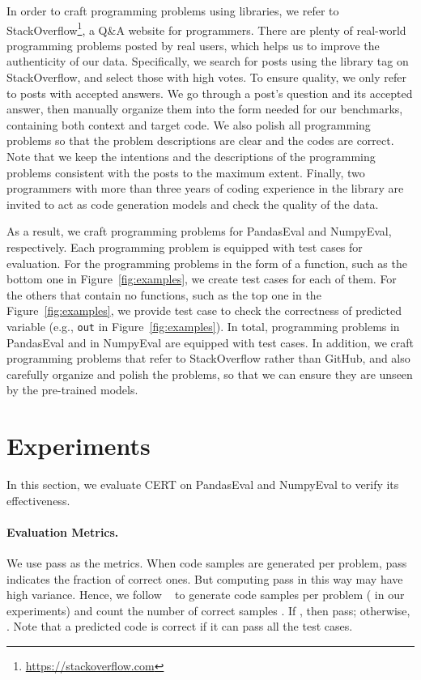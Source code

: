 \documentclass{article}
\newcommand{\cert}{\textsc{CERT}\xspace}
\newcommand{\peval}{PandasEval\xspace}
\newcommand{\neval}{NumpyEval\xspace}
\newcommand{\citet}[1] {\citeauthor{#1}~\shortcite{#1}}
\begin{document}
In order to craft programming problems using libraries, we refer to StackOverflow\footnote{\url{https://stackoverflow.com}}, a Q\&A website for programmers.
There are plenty of real-world programming problems posted by real users, which helps us to improve the authenticity of our data. 
Specifically, we search for posts using the library tag on StackOverflow, and select those with high votes. To ensure quality, we only refer to posts with accepted answers. We go through a post's question and its accepted answer, then manually organize them into the form needed for our benchmarks, containing both context and target code. We also polish all programming problems so that the problem descriptions are clear and the codes are correct. Note that we keep the intentions and the descriptions of the programming problems consistent with the posts to the maximum extent.
Finally, two programmers with more than three years of coding experience in the library are invited to act as code generation models and check the quality of the data.

As a result, we craft  programming problems for \peval and \neval, respectively. 
Each programming problem is equipped with test cases for evaluation. 
For the programming problems in the form of a function, such as the bottom one in Figure~\ref{fig:examples}, we create  test cases for each of them. For the others that contain no functions, such as the top one in the Figure~\ref{fig:examples}, we provide  test case to check the correctness of predicted variable (e.g., \texttt{out} in Figure~\ref{fig:examples}). 
In total,  programming problems in \peval and  in \neval are equipped with  test cases.
In addition, we craft programming problems that refer to StackOverflow rather than GitHub, and also carefully organize and polish the problems, so that we can ensure they are unseen by the pre-trained models.

\section{Experiments} \label{experiments}
In this section, we evaluate \cert on \peval and \neval to verify its effectiveness.

\paragraph{Evaluation Metrics.}
We use pass as the metrics. When  code samples are generated per problem, pass indicates the fraction of correct ones. But computing pass in this way may have high variance. Hence, we follow \citet{chen2021evaluating} to generate  code samples per problem ( in our experiments) and count the number of correct samples . If , then pass; otherwise, . 
Note that a predicted code is correct if it can pass all the test cases.
\end{document}
